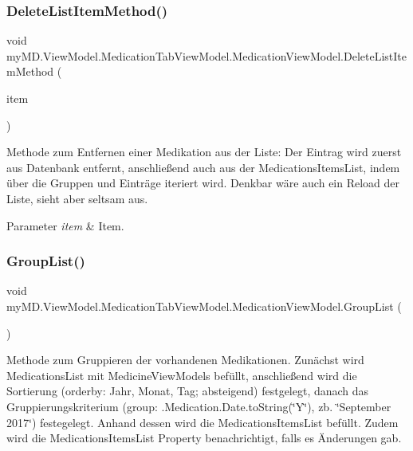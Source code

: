 \subsubsection{\texorpdfstring{Delete\+List\+Item\+Method()}{DeleteListItemMethod()}}
{\footnotesize\ttfamily void my\+M\+D.\+View\+Model.\+Medication\+Tab\+View\+Model.\+Medication\+View\+Model.\+Delete\+List\+Item\+Method (\begin{DoxyParamCaption}\item[{\mbox{\hyperlink{classmy_m_d_1_1_view_model_1_1_medication_tab_view_model_1_1_medicine_view_model}{Medicine\+View\+Model}}}]{item }\end{DoxyParamCaption})}



Methode zum Entfernen einer Medikation aus der Liste\+: Der Eintrag wird zuerst aus Datenbank entfernt, anschließend auch aus der Medications\+Items\+List, indem über die Gruppen und Einträge iteriert wird. Denkbar wäre auch ein Reload der Liste, sieht aber seltsam aus. 


\begin{DoxyParams}{Parameter}
{\em item} & Item.\\
\hline
\end{DoxyParams}
\mbox{\label{classmy_m_d_1_1_view_model_1_1_medication_tab_view_model_1_1_medication_view_model_a51934d08200971cc38dfaeb26d790620}} 
\subsubsection{\texorpdfstring{Group\+List()}{GroupList()}}
{\footnotesize\ttfamily void my\+M\+D.\+View\+Model.\+Medication\+Tab\+View\+Model.\+Medication\+View\+Model.\+Group\+List (\begin{DoxyParamCaption}{ }\end{DoxyParamCaption})}



Methode zum Gruppieren der vorhandenen Medikationen. Zunächst wird Medications\+List mit Medicine\+View\+Models befüllt, anschließend wird die Sortierung (orderby\+: Jahr, Monat, Tag; absteigend) festgelegt, danach das Gruppierungskriterium (group\+: .Medication.\+Date.\+to\+String(\char`\"{}\+Y\char`\"{}), zb. \char`\"{}\+September 2017\char`\"{}) festegelegt. Anhand dessen wird die Medications\+Items\+List befüllt. Zudem wird die Medications\+Items\+List Property benachrichtigt, falls es Änderungen gab. 

